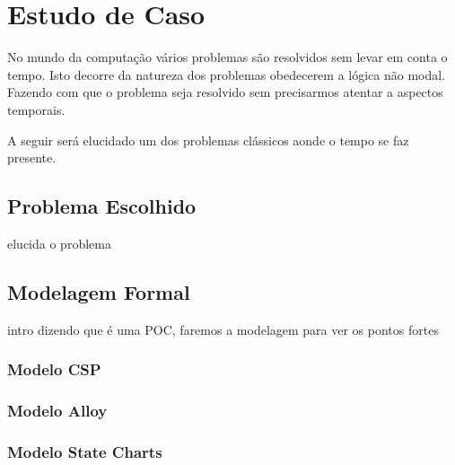 \section{Estudo de Caso}
No mundo da computação vários problemas são resolvidos sem levar em conta o tempo. 
Isto decorre da natureza dos problemas obedecerem a lógica não modal. Fazendo com que o 
problema seja resolvido sem precisarmos atentar a aspectos temporais.

A seguir será elucidado um dos problemas clássicos aonde o tempo se faz presente.
\subsection{Problema Escolhido}
elucida o problema
\subsection{Modelagem Formal}
intro dizendo que é uma POC, faremos a modelagem para ver os pontos fortes
\subsubsection{Modelo CSP}
\subsubsection{Modelo Alloy}
\subsubsection{Modelo State Charts}
